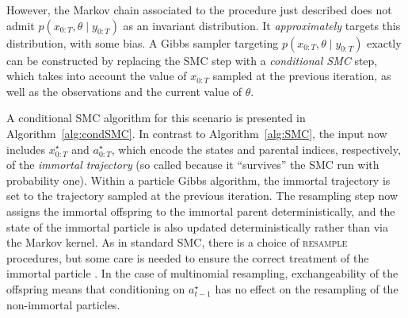 However, the Markov chain associated to the procedure just described does not admit $p(x_{0:T},\theta \mid y_{0:T})$ as an invariant distribution. It \emph{approximately} targets this distribution, with some bias.
A Gibbs sampler targeting $p(x_{0:T},\theta \mid y_{0:T})$ exactly can be constructed by replacing the SMC step with a \emph{conditional SMC} step, which takes into account the value of $x_{0:T}$ sampled at the previous iteration, as well as the observations and the current value of $\theta$.

A conditional SMC algorithm for this scenario is presented in Algorithm~\ref{alg:condSMC}.
In contrast to Algorithm~\ref{alg:SMC}, the input now includes $x_{0:T}^\star$ and $a_{0:T}^\star$, which encode the states and parental indices, respectively, of the \emph{immortal trajectory} (so called because it ``survives'' the SMC run with probability one). Within a particle Gibbs algorithm, the immortal trajectory is set to the trajectory sampled at the previous iteration.
The resampling step now assigns the immortal offspring to the immortal parent deterministically, and the state of the immortal particle is also updated deterministically rather than via the Markov kernel.
As in standard SMC, there is a choice of \textsc{resample} procedures, but some care is needed to ensure the correct treatment of the immortal particle \parencite[for details see e.g.][]{lee2019}.
In the case of multinomial resampling, exchangeability of the offspring means that conditioning on $a_{t-1}^\star$ has no effect on the resampling of the non-immortal particles.

